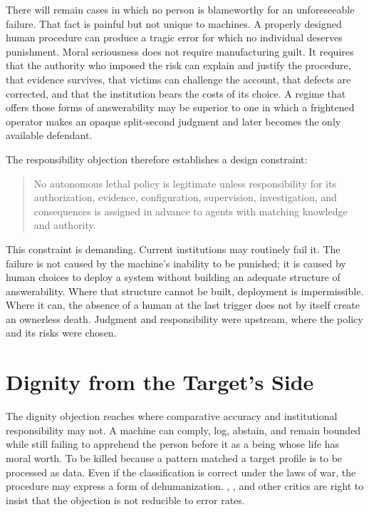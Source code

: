 \documentclass[11pt]{article}
\begin{document}
There will remain cases in which no person is blameworthy for an unforeseeable failure. That fact is painful but not unique to machines. A properly designed human procedure can produce a tragic error for which no individual deserves punishment. Moral seriousness does not require manufacturing guilt. It requires that the authority who imposed the risk can explain and justify the procedure, that evidence survives, that victims can challenge the account, that defects are corrected, and that the institution bears the costs of its choice. A regime that offers those forms of answerability may be superior to one in which a frightened operator makes an opaque split-second judgment and later becomes the only available defendant.

The responsibility objection therefore establishes a design constraint:

\begin{quote}
No autonomous lethal policy is legitimate unless responsibility for its authorization, evidence, configuration, supervision, investigation, and consequences is assigned in advance to agents with matching knowledge and authority.
\end{quote}

This constraint is demanding. Current institutions may routinely fail it. The failure is not caused by the machine's inability to be punished; it is caused by human choices to deploy a system without building an adequate structure of answerability. Where that structure cannot be built, deployment is impermissible. Where it can, the absence of a human at the last trigger does not by itself create an ownerless death. Judgment and responsibility were upstream, where the policy and its risks were chosen.

\section{Dignity from the Target's Side}
\label{sec:dignity}

The dignity objection reaches where comparative accuracy and institutional responsibility may not. A machine can comply, log, abstain, and remain bounded while still failing to apprehend the person before it as a being whose life has moral worth. To be killed because a pattern matched a target profile is to be processed as data. Even if the classification is correct under the laws of war, the procedure may express a form of dehumanization. \citet{asaro2012}, \citet{heyns2013}, and other critics are right to insist that the objection is not reducible to error rates.
\end{document}
